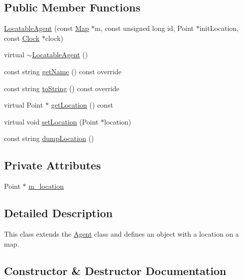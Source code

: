 \subsection*{Public Member Functions}
\begin{DoxyCompactItemize}
\item 
\hyperlink{class_locatable_agent_ab4939cf1ef1352acdac76736bfe47fc7}{Locatable\+Agent} (const \hyperlink{class_map}{Map} $\ast$m, const unsigned long id, Point $\ast$init\+Location, const \hyperlink{class_clock}{Clock} $\ast$clock)
\item 
virtual \hyperlink{class_locatable_agent_ad721398f0b4e841aad377cd91a7f5e3a}{$\sim$\+Locatable\+Agent} ()
\item 
const string \hyperlink{class_locatable_agent_a754105958bb672744b525538f1584a7b}{get\+Name} () const override
\item 
const string \hyperlink{class_locatable_agent_a88674f4c8ab9b1b2f3986b226bf4244f}{to\+String} () const override
\item 
virtual Point $\ast$ \hyperlink{class_locatable_agent_ad779af171c67ce0d478fc79b904e2d90}{get\+Location} () const
\item 
virtual void \hyperlink{class_locatable_agent_a754b237c404b77714fedd397f214bc02}{set\+Location} (Point $\ast$location)
\item 
const string \hyperlink{class_locatable_agent_af9a6dbd25b47c23a71c95b205da3a28d}{dump\+Location} ()
\end{DoxyCompactItemize}
\subsection*{Private Attributes}
\begin{DoxyCompactItemize}
\item 
Point $\ast$ \hyperlink{class_locatable_agent_a2a76ba315733ab26f19229a71071704d}{m\+\_\+location}
\end{DoxyCompactItemize}


\subsection{Detailed Description}
This class extends the \hyperlink{class_agent}{Agent} class and defines an object with a location on a map. 

\subsection{Constructor \& Destructor Documentation}
\mbox{\label{class_locatable_agent_ab4939cf1ef1352acdac76736bfe47fc7}} 
